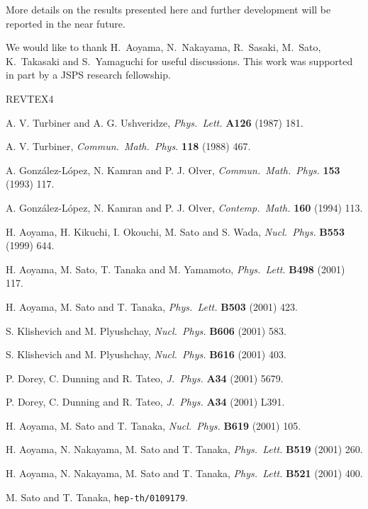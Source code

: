 \documentclass[a4paper,preprint,amsfonts,amssymb,amsmath,%
tightenlines,nofootinbib,noshowpacs]{revtex4}
\begin{document}
More details on the results presented here and further development
 will be reported in the near future.
\begin{acknowledgments}%
We would like to thank H.~Aoyama, N.~Nakayama, R.~Sasaki, M.~Sato,
 K.~Takasaki and S.~Yamaguchi for useful discussions.
This work was supported in part by a JSPS research fellowship.
\end{acknowledgments}REVTEX4


\begin{thebibliography}{99}
\providecommand{\J}[4]{\textit{#1} \textbf{#2} (#3) #4}


A. V. Turbiner and A. G. Ushveridze,
\J{Phys.~Lett.}{A126}{1987}{181}.

A. V. Turbiner,
\J{Commun.~Math.~Phys.}{118}{1988}{467}.

A. Gonz{\'{a}}lez-L{\'{o}}pez, N. Kamran and P. J. Olver,
\J{Commun.~Math.~Phys.}{153}{1993}{117}.

A. Gonz{\'{a}}lez-L{\'{o}}pez, N. Kamran and P. J. Olver,
\J{Contemp.~Math.}{160}{1994}{113}.

H. Aoyama, H. Kikuchi, I. Okouchi, M. Sato and S. Wada,
\J{Nucl.~Phys.}{B553}{1999}{644}.

H. Aoyama, M. Sato, T. Tanaka and M. Yamamoto,
\J{Phys.~Lett.}{B498}{2001}{117}.

H. Aoyama, M. Sato and T. Tanaka,
\J{Phys.~Lett.}{B503}{2001}{423}.

S. Klishevich and M. Plyushchay,
\J{Nucl.~Phys.}{B606}{2001}{583}.

S. Klishevich and M. Plyushchay,
\J{Nucl.~Phys.}{B616}{2001}{403}.

P. Dorey, C. Dunning and R. Tateo,
\J{J.~Phys.}{A34}{2001}{5679}.

P. Dorey, C. Dunning and R. Tateo,
\J{J.~Phys.}{A34}{2001}{L391}.

H. Aoyama, M. Sato and T. Tanaka,
\J{Nucl.~Phys.}{B619}{2001}{105}.

H. Aoyama, N. Nakayama, M. Sato and T. Tanaka,
\J{Phys.~Lett.}{B519}{2001}{260}.

H. Aoyama, N. Nakayama, M. Sato and T. Tanaka,
\J{Phys.~Lett.}{B521}{2001}{400}.

M. Sato and T. Tanaka, \texttt{hep-th/0109179}.


\end{thebibliography}
\end{document}
